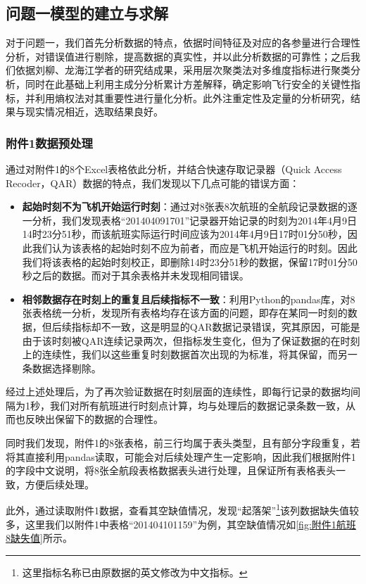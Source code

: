 \documentclass{MathorCupModeling}
\begin{document}
	\subsection{问题一模型的建立与求解}
	对于问题一，我们首先分析数据的特点，依据时间特征及对应的各参量进行合理性分析，对错误值进行剔除，提高数据的真实性，并以此分析数据的可靠性；之后我们依据刘柳\textcolor{blue}{\cite{Paper:刘柳}}、龙海江\textcolor{blue}{\cite{Paper:龙海江}}学者的研究结成果，采用层次聚类法对多维度指标进行聚类分析，同时在此基础上利用主成分分析累计方差解释，确定影响飞行安全的关键性指标，并利用熵权法对其重要性进行量化分析。此外注重定性及定量的分析研究，结果与现实情况相近，选取结果良好。
	\subsubsection{附件1数据预处理}
	通过对附件1的8个Excel表格依此分析，并结合快速存取记录器（Quick Access Recoder，QAR）数据的特点，我们发现以下几点可能的错误方面：
	\begin{itemize}
		\item \textbf{起始时刻不为飞机开始运行时刻}：通过对8张表8次航班的全航段记录数据的逐一分析，我们发现表格“201404091701”记录器开始记录的时刻为2014年4月9日14时23分51秒，而该航班实际运行时间应该为2014年4月9日17时01分50秒，因此我们认为该表格的起始时刻不应为前者，而应是飞机开始运行的时刻。因此我们将该表格的起始时刻校正，即删除14时23分51秒的数据，保留17时01分50秒之后的数据。而对于其余表格并未发现相同错误。
		\item \textbf{相邻数据存在时刻上的重复且后续指标不一致}：利用Python的pandas库，对8张表格统一分析，发现所有表格均存在该方面的问题，即存在某同一时刻的数据，但后续指标却不一致，这是明显的QAR数据记录错误，究其原因，可能是由于该时刻被QAR连续记录两次，但指标发生变化，但为了保证数据的在时刻上的连续性，我们以这些重复时刻数据首次出现的为标准，将其保留，而另一条数据选择剔除。
	\end{itemize}

	经过上述处理后，为了再次验证数据在时刻层面的连续性，即每行记录的数据均间隔为1秒，我们对所有航班进行时刻点计算，均与处理后的数据记录条数一致，从而也反映出保留下的数据的合理性。

	同时我们发现，附件1的8张表格，前三行均属于表头类型，且有部分字段重复，若将其直接利用pandas读取，可能会对后续处理产生一定影响，因此我们根据附件1的字段中文说明，将8张全航段表格数据表头进行处理，且保证所有表格表头一致，方便后续处理。

	此外，通过读取附件1数据，查看其空缺值情况，发现“起落架”\textcolor{blue}{\footnote{这里指标名称已由原数据的英文修改为中文指标。}}该列数据缺失值较多，这里我们以附件1中表格“201404101159”为例，其空缺值情况如\textcolor{blue}{\cref{fig:附件1航班8缺失值}}所示。
\end{document}

